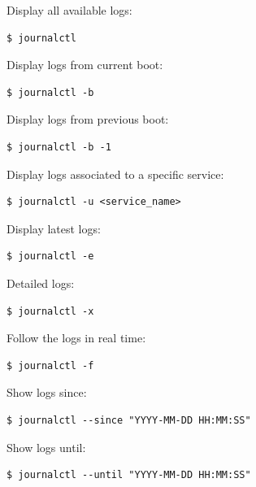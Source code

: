 \documentclass{article}
\newenvironment{codetemplate}[1][]{%
  \mybasecolorbox[#1]
  \itshape
}{%
  \endmybasecolorbox
}
\begin{document}
Display all available logs:
\begin{codetemplate}{}
\begin{verbatim}
$ journalctl
\end{verbatim}
\end{codetemplate}

Display logs from current boot:
\begin{codetemplate}{}
\begin{verbatim}
$ journalctl -b 
\end{verbatim}
\end{codetemplate}

Display logs from previous boot:
\begin{codetemplate}{}
\begin{verbatim}
$ journalctl -b -1
\end{verbatim}
\end{codetemplate}

Display logs associated to a specific service:
\begin{codetemplate}{}
\begin{verbatim}
$ journalctl -u <service_name>
\end{verbatim}
\end{codetemplate}

Display latest logs:
\begin{codetemplate}{}
\begin{verbatim}
$ journalctl -e
\end{verbatim}
\end{codetemplate}

Detailed logs:
\begin{codetemplate}{}
\begin{verbatim}
$ journalctl -x
\end{verbatim}
\end{codetemplate}

Follow the logs in real time:
\begin{codetemplate}{}
\begin{verbatim}
$ journalctl -f
\end{verbatim}
\end{codetemplate}

Show logs since:
\begin{codetemplate}{}
\begin{verbatim}
$ journalctl --since "YYYY-MM-DD HH:MM:SS"
\end{verbatim}
\end{codetemplate}

Show logs until:
\begin{codetemplate}{}
\begin{verbatim}
$ journalctl --until "YYYY-MM-DD HH:MM:SS"
\end{verbatim}
\end{codetemplate}
\end{document}
